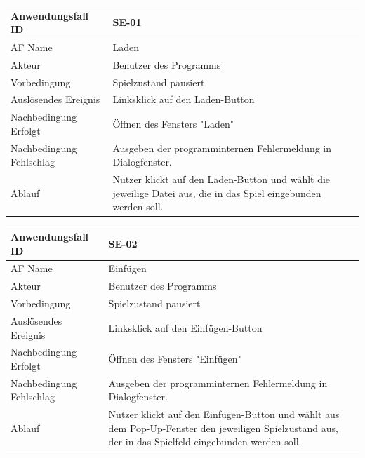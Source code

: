 \documentclass[11pt,a4paper]{article}
\begin{document}
    
    \begin{tabular}[m]{|m{7cm}|m{9cm}|}
        \hline
        Anwendungsfall ID     & SE-01 \\ %
        \hline
        AF Name     &  Laden \\
        \hline
        Akteur &  Benutzer des Programms \\
        \hline
        Vorbedingung & Spielzustand pausiert\\
        \hline
        Auslösendes Ereignis & Linksklick auf den Laden-Button\\
        \hline
        Nachbedingung Erfolgt & Öffnen des Fensters "Laden"\\
        \hline
        Nachbedingung Fehlschlag & Ausgeben der programminternen Fehlermeldung in Dialogfenster.\\
        \hline
        Ablauf & Nutzer klickt auf den Laden-Button und wählt die jeweilige Datei aus, die in das Spiel eingebunden werden soll.\\
        \hline
    \end{tabular}
    \par
    
    
        \begin{tabular}[m]{|m{7cm}|m{9cm}|}
        \hline
        Anwendungsfall ID     & SE-02 \\ %
        \hline
        AF Name     &  Einfügen \\
        \hline
        Akteur&Benutzer des Programms \\
        \hline
        Vorbedingung & Spielzustand pausiert\\
        \hline
        Auslösendes Ereignis & Linksklick auf den Einfügen-Button\\
        \hline
        Nachbedingung Erfolgt&Öffnen des Fensters "Einfügen"\\
        \hline
        Nachbedingung Fehlschlag&Ausgeben der programminternen Fehlermeldung in Dialogfenster.\\
        \hline
        Ablauf&Nutzer klickt auf den Einfügen-Button und wählt aus dem Pop-Up-Fenster den jeweiligen Spielzustand aus, der in das Spielfeld eingebunden werden soll.\\
        \hline
    \end{tabular}
    \par
    
\end{document}
